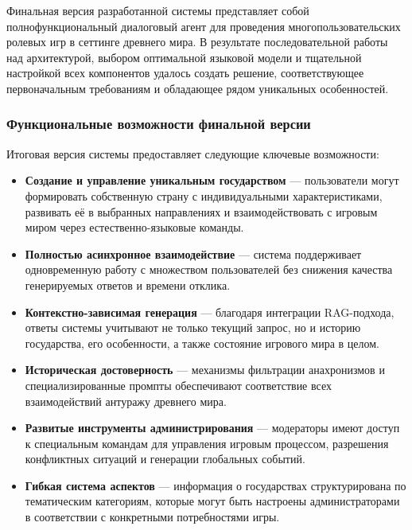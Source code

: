 Финальная версия разработанной системы представляет собой полнофункциональный диалоговый агент для проведения многопользовательских ролевых игр в сеттинге древнего мира. В результате последовательной работы над архитектурой, выбором оптимальной языковой модели и тщательной настройкой всех компонентов удалось создать решение, соответствующее первоначальным требованиям и обладающее рядом уникальных особенностей.

\subsubsection{Функциональные возможности финальной версии}

Итоговая версия системы предоставляет следующие ключевые возможности:

\begin{itemize}
\item \textbf{Создание и управление уникальным государством} — пользователи могут формировать собственную страну с индивидуальными характеристиками, развивать её в выбранных направлениях и взаимодействовать с игровым миром через естественно-языковые команды.

\item \textbf{Полностью асинхронное взаимодействие} — система поддерживает одновременную работу с множеством пользователей без снижения качества генерируемых ответов и времени отклика.

\item \textbf{Контекстно-зависимая генерация} — благодаря интеграции RAG-подхода, ответы системы учитывают не только текущий запрос, но и историю государства, его особенности, а также состояние игрового мира в целом.

\item \textbf{Историческая достоверность} — механизмы фильтрации анахронизмов и специализированные промпты обеспечивают соответствие всех взаимодействий антуражу древнего мира.

\item \textbf{Развитые инструменты администрирования} — модераторы имеют доступ к специальным командам для управления игровым процессом, разрешения конфликтных ситуаций и генерации глобальных событий.

\item \textbf{Гибкая система аспектов} — информация о государствах структурирована по тематическим категориям, которые могут быть настроены администраторами в соответствии с конкретными потребностями игры.
\end{itemize}

